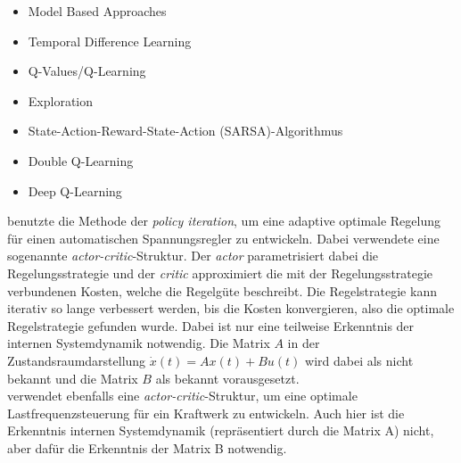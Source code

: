 \begin{itemize}
	\item Model Based Approaches
	\item Temporal Difference Learning
	\item Q-Values/Q-Learning
	\item Exploration
	\item State-Action-Reward-State-Action (SARSA)-Algorithmus
	\item Double Q-Learning
	\item Deep Q-Learning
\end{itemize}

\cite{Prasad.2014} benutzte die Methode der \textit{policy iteration}, um eine adaptive optimale Regelung für einen automatischen Spannungsregler zu entwickeln. Dabei verwendete \cite{Prasad.2014} eine sogenannte \textit{actor-critic}-Struktur. Der \textit{actor} parametrisiert dabei die Regelungsstrategie und der \textit{critic} approximiert die mit der Regelungsstrategie verbundenen Kosten, welche die Regelgüte beschreibt. Die Regelstrategie kann iterativ so lange verbessert werden, bis die Kosten konvergieren, also die optimale Regelstrategie gefunden wurde. Dabei ist nur eine teilweise Erkenntnis der internen Systemdynamik notwendig. Die Matrix $A$ in der Zustandsraumdarstellung $\dot{x}(t) = A x(t) + B u(t) $ wird dabei als nicht bekannt und die Matrix $B$ als bekannt vorausgesetzt. \\
\cite{Vrabie.2009} verwendet ebenfalls eine \textit{actor-critic}-Struktur, um eine optimale Lastfrequenzsteuerung für ein Kraftwerk zu entwickeln. Auch hier ist die Erkenntnis internen Systemdynamik (repräsentiert durch die Matrix A) nicht, aber dafür die Erkenntnis der Matrix B notwendig.





 







